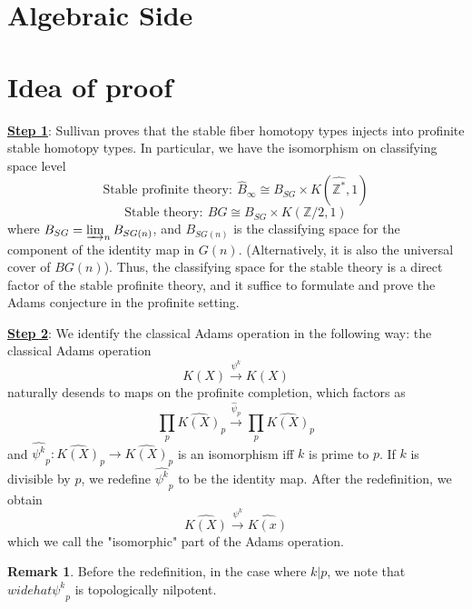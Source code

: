 \documentclass{article}
\theoremstyle{definition}
\theoremstyle{definition}
\theoremstyle{definition}
\newtheorem{remark}{Remark}[theorem]
\theoremstyle{definition}
\theoremstyle{definition}
\theoremstyle{definition}
\theoremstyle{definition}
\begin{document}
\section{Algebraic Side}



\section*{Idea of proof}

\underline{\textbf{Step 1}}: Sullivan proves that the stable fiber homotopy types injects into profinite stable homotopy types. In particular, we have the isomorphism on classifying space level 
\[\textrm{Stable profinite theory}: \ \widehat{B}_{\infty}\cong B_{SG}\times K(\widehat{\mathbb{Z}^*},1)\]
\[\textrm{Stable theory}: \ BG\cong B_{SG}\times K(\mathbb{Z}/2,1)\]
where $B_{SG}=\varinjlim_n B_{SG(n)}$, and $B_{SG(n)}$ is the classifying space for the component of the identity map in $G(n)$. (Alternatively, it is also the universal cover of $BG(n)$). Thus, the classifying space for the stable theory is a direct factor of the stable profinite theory, and it suffice to formulate and prove the Adams conjecture in the profinite setting. 

\underline{\textbf{Step 2}}: We identify the classical Adams operation in the following way: the classical Adams operation 
\[K(X)\xrightarrow{\psi^k}K(X)\]
naturally desends to maps on the profinite completion, which factors as 
\[\prod_p \widehat{K(X)}_p\xrightarrow{\widehat{\psi}_p} \prod_p \widehat{K(X)}_p\]
and $\widehat{\psi^k}_p: \widehat{K(X)}_p\to \widehat{K(X)}_p$ is an isomorphism iff $k$ is prime to $p$. If $k$ is divisible by $p$, we redefine $\widehat{\psi^k}_p$ to be the identity map. After the redefinition, we obtain 
\[\widehat{K(X)}\xrightarrow{\psi^k}\widehat{K(x)}\]
which we call the "isomorphic" part of the Adams operation. 


\begin{tcolorbox}[colback=green!5!white,colframe=green!30!white]
\begin{remark}
Before the redefinition, in the case where $k|p$, we note that$ widehat{\psi^k}_p$ is topologically nilpotent. 
\end{remark}
\end{tcolorbox}
\end{document}
